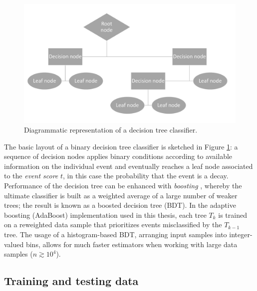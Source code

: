 \begin{figure}
	\centering
	\includegraphics[height=.3\textheight]{graphics/04-event_selection/decision_tree.pdf}
	\caption{Diagrammatic representation of a decision tree classifier.}
	\label{fig:4:decision_tree}
\end{figure}

The basic layout of a binary decision tree classifier is sketched in Figure \ref{fig:4:decision_tree}:
a sequence of decision nodes applies binary conditions according to available information on the individual event and eventually reaches a leaf node associated to the \textit{event score} $t$, in this case the probability that the event is a \demonstratorshort decay.
Performance of the decision tree can be enhanced with \textit{boosting} \cite{Yann:2013}, whereby the ultimate classifier is built as a weighted average of a large number of weaker trees;
the result is known as a boosted decision tree (BDT).
In the adaptive boosting (AdaBoost) implementation used in this thesis, each tree $T_k$ is trained on a reweighted data sample that prioritizes events misclassified by the $T_{k-1}$ tree.
The usage of a histogram-based BDT, arranging input samples into integer-valued bins, allows for much faster estimators when working with large data samples ($n \gtrsim {10}^4$).


\subsection{Training and testing data}
\label{sec:4:train_test_data}

